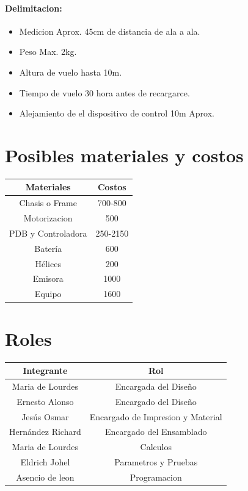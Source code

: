 \documentclass[11pt,a4paper]{article}
\begin{document}
\paragraph{Delimitacion:}


\begin{itemize}
\item Medicion Aprox. 45cm de distancia de ala a ala.
\item Peso Max. 2kg.
\item Altura de vuelo hasta 10m.
\item Tiempo de vuelo 30 hora antes de recargarce.
\item Alejamiento de el dispositivo de control 10m Aprox.
\end{itemize} 

\section{Posibles materiales y costos}

\begin{tabular}{|c|c|}
\hline
\textbf{Materiales} & \textbf{Costos}\\ \hline
Chasis o Frame & 700-800 \\ \hline
Motorizacion & 500 \\ \hline
PDB y Controladora & 250-2150 \\ \hline
Batería & 600 \\ \hline
Hélices & 200 \\ \hline
Emisora & 1000 \\ \hline
Equipo & 1600 \\ \hline
\end{tabular}



\section{Roles}

\begin{tabular}{|c|c|}

\hline
\textbf{Integrante} & \textbf{Rol} \\ \hline
Maria de Lourdes  & Encargada del Diseño \\ \hline
Ernesto Alonso & Encargado del Diseño \\ \hline
Jesús Osmar & Encargado de Impresion y Material \\ \hline
Hernández Richard & Encargado del Ensamblado \\ \hline
Maria de Lourdes & Calculos \\ \hline
Eldrich Johel & Parametros y Pruebas \\ \hline
Asencio de leon & Programacion \\ \hline
\end{tabular}
\end{document}
